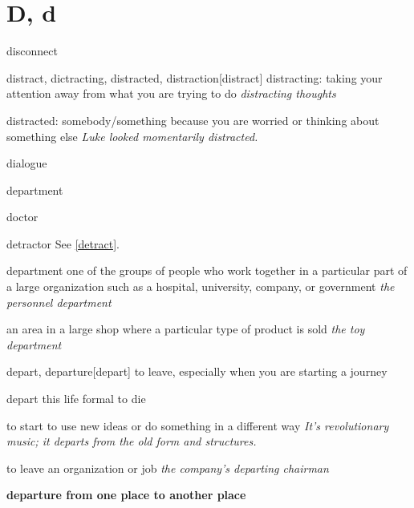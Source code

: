 \section{D, d}

\begin{DefWord}{disconnect}
\end{DefWord}

\begin{DefWord}{distract, dictracting, distracted, distraction}[distract]
    distracting: taking your attention away from what you are trying to do
    \textit{distracting thoughts}

    distracted: somebody/something because you are worried or thinking about something else
    \textit{Luke looked momentarily distracted.}
\end{DefWord}

\begin{DefWord}{dialogue}
\end{DefWord}

\begin{DefWord}{department}
\end{DefWord}

\begin{DefWord}{doctor}
\end{DefWord}

\begin{DefWord}{detractor}
    See \ref{detract}.
\end{DefWord}

\begin{DefWord}{department}
    one of the groups of people who work together in a particular part of a large organization such as a hospital, university, company, or government
    \textit{the personnel department}

    an area in a large shop where a particular type of product is sold
    \textit{the toy department}
\end{DefWord}

\begin{DefWord}{depart, departure}[depart]
    to leave, especially when you are starting a journey

    depart this life formal to die

    to start to use new ideas or do something in a different way
    \textit{It's revolutionary music; it departs from the old form and structures.}

    to leave an organization or job
    \textit{the company's departing chairman}

    \textbf{departure from one place to another place}
\end{DefWord}

